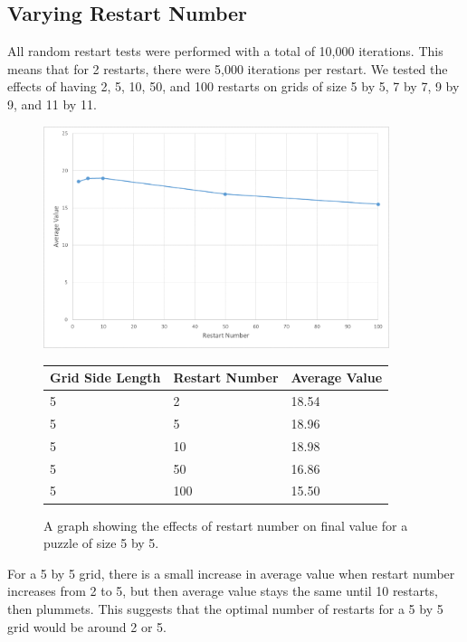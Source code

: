 \documentclass[12pt]{article}
\begin{document}
\subsection*{Varying Restart Number}

All random restart tests were performed with a total of 10,000 iterations. This means that for 2 restarts, there were 5,000 iterations per restart. We tested the effects of having 2, 5, 10, 50, and 100 restarts on grids of size 5 by 5, 7 by 7, 9 by 9, and 11 by 11.

\begin{figure}[H]
    \centering
    \includegraphics[width=0.9\textwidth]{random_restarts_5x5_restarts_excel}
\begin{tabular}{ |p{4cm}||p{4cm}|p{4cm}|  }
 \hline
Grid Side Length& Restart Number &Average Value\\
 \hline
5&2&18.54\\
5&5&18.96\\
5&10&18.98\\
5&50&16.86\\
5&100&15.50\\
 \hline
\end{tabular}
    \caption{A graph showing the effects of restart number on final value for a puzzle of size 5 by 5.}
    \label{fig:random_restarts_5x5_restarts}
\end{figure}

For a 5 by 5 grid, there is a small increase in average value when restart number increases from 2 to 5, but then average value stays the same until 10 restarts, then plummets. This suggests that the optimal number of restarts for a 5 by 5 grid would be around 2 or 5.
\end{document}
